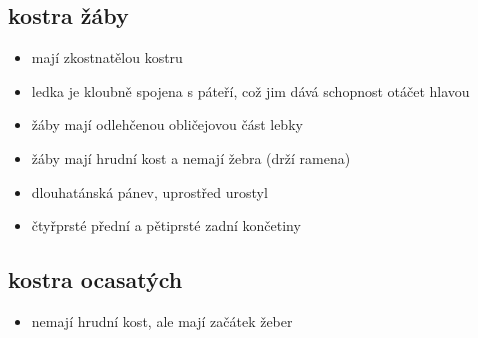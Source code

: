 \documentclass{article}
\begin{document}
\subsection{kostra žáby}
\begin{itemize}
  \item mají zkostnatělou kostru
  \item ledka je kloubně spojena s páteří, což jim dává schopnost otáčet hlavou
  \item žáby mají odlehčenou obličejovou část lebky
  \item žáby mají hrudní kost a nemají žebra (drží ramena)
  \item dlouhatánská pánev, uprostřed urostyl
  \item čtyřprsté přední a pětiprsté zadní končetiny
\end{itemize}

\subsection{kostra ocasatých}
\begin{itemize}
  \item nemají hrudní kost, ale mají začátek žeber
\end{itemize}
\end{document}
